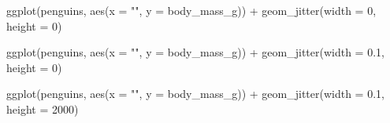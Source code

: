 \documentclass[
  letterpaper,
  DIV=11,
  numbers=noendperiod]{scrreprt}
\newenvironment{Shaded}{\begin{snugshade}}{\end{snugshade}}
\newcommand{\AttributeTok}[1]{\textcolor[rgb]{0.40,0.45,0.13}{#1}}
\newcommand{\DecValTok}[1]{\textcolor[rgb]{0.68,0.00,0.00}{#1}}
\newcommand{\FloatTok}[1]{\textcolor[rgb]{0.68,0.00,0.00}{#1}}
\newcommand{\FunctionTok}[1]{\textcolor[rgb]{0.28,0.35,0.67}{#1}}
\newcommand{\NormalTok}[1]{\textcolor[rgb]{0.00,0.23,0.31}{#1}}
\newcommand{\SpecialCharTok}[1]{\textcolor[rgb]{0.37,0.37,0.37}{#1}}
\newcommand{\StringTok}[1]{\textcolor[rgb]{0.13,0.47,0.30}{#1}}
\begin{document}
\begin{Shaded}
\begin{Highlighting}[]
\FunctionTok{ggplot}\NormalTok{(penguins, }\FunctionTok{aes}\NormalTok{(}\AttributeTok{x =} \StringTok{""}\NormalTok{, }\AttributeTok{y =}\NormalTok{ body\_mass\_g)) }\SpecialCharTok{+}
  \FunctionTok{geom\_jitter}\NormalTok{(}\AttributeTok{width =} \DecValTok{0}\NormalTok{, }\AttributeTok{height =} \DecValTok{0}\NormalTok{)}

\FunctionTok{ggplot}\NormalTok{(penguins, }\FunctionTok{aes}\NormalTok{(}\AttributeTok{x =} \StringTok{""}\NormalTok{, }\AttributeTok{y =}\NormalTok{ body\_mass\_g)) }\SpecialCharTok{+}
  \FunctionTok{geom\_jitter}\NormalTok{(}\AttributeTok{width =} \FloatTok{0.1}\NormalTok{, }\AttributeTok{height =} \DecValTok{0}\NormalTok{)}

\FunctionTok{ggplot}\NormalTok{(penguins, }\FunctionTok{aes}\NormalTok{(}\AttributeTok{x =} \StringTok{""}\NormalTok{, }\AttributeTok{y =}\NormalTok{ body\_mass\_g)) }\SpecialCharTok{+}
  \FunctionTok{geom\_jitter}\NormalTok{(}\AttributeTok{width =} \FloatTok{0.1}\NormalTok{, }\AttributeTok{height =} \DecValTok{2000}\NormalTok{)}
\end{Highlighting}
\end{Shaded}
\end{document}
